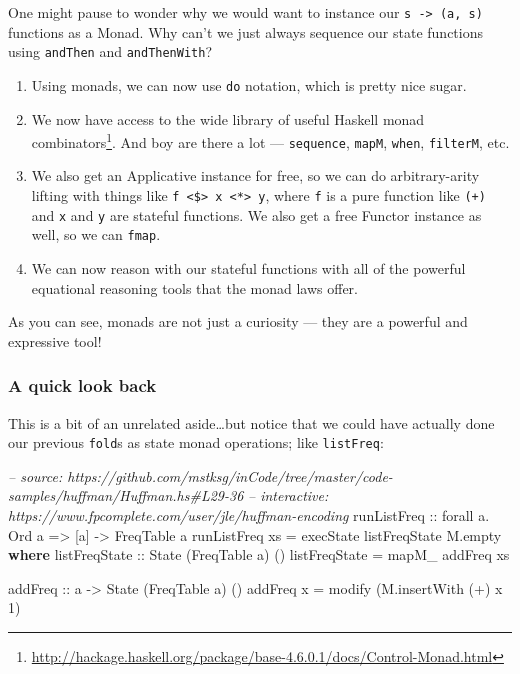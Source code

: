 \documentclass[]{article}
\newenvironment{Shaded}{\begin{snugshade}}{\end{snugshade}}
\newcommand{\CommentTok}[1]{\textcolor[rgb]{0.56,0.35,0.01}{\textit{#1}}}
\newcommand{\DataTypeTok}[1]{\textcolor[rgb]{0.13,0.29,0.53}{#1}}
\newcommand{\DecValTok}[1]{\textcolor[rgb]{0.00,0.00,0.81}{#1}}
\newcommand{\FunctionTok}[1]{\textcolor[rgb]{0.00,0.00,0.00}{#1}}
\newcommand{\KeywordTok}[1]{\textcolor[rgb]{0.13,0.29,0.53}{\textbf{#1}}}
\newcommand{\NormalTok}[1]{#1}
\newcommand{\OtherTok}[1]{\textcolor[rgb]{0.56,0.35,0.01}{#1}}
\renewcommand{\href}[2]{#2\footnote{\url{#1}}}
\begin{document}
One might pause to wonder why we would want to instance our
\texttt{s\ -\textgreater{}\ (a,\ s)} functions as a Monad. Why can't we just
always sequence our state functions using \texttt{andThen} and
\texttt{andThenWith}?

\begin{enumerate}
\def\labelenumi{\arabic{enumi}.}
\item
  Using monads, we can now use \texttt{do} notation, which is pretty nice sugar.
\item
  We now have access to the wide library of useful Haskell
  \href{http://hackage.haskell.org/package/base-4.6.0.1/docs/Control-Monad.html}{monad
  combinators}. And boy are there a lot --- \texttt{sequence}, \texttt{mapM},
  \texttt{when}, \texttt{filterM}, etc.
\item
  We also get an Applicative instance for free, so we can do arbitrary-arity
  lifting with things like
  \texttt{f\ \textless{}\$\textgreater{}\ x\ \textless{}*\textgreater{}\ y},
  where \texttt{f} is a pure function like \texttt{(+)} and \texttt{x} and
  \texttt{y} are stateful functions. We also get a free Functor instance as
  well, so we can \texttt{fmap}.
\item
  We can now reason with our stateful functions with all of the powerful
  equational reasoning tools that the monad laws offer.
\end{enumerate}

As you can see, monads are not just a curiosity --- they are a powerful and
expressive tool!

\hypertarget{a-quick-look-back}{%
\subsubsection{A quick look back}\label{a-quick-look-back}}

This is a bit of an unrelated aside\ldots{}but notice that we could have
actually done our previous \texttt{fold}s as state monad operations; like
\texttt{listFreq}:

\begin{Shaded}
\begin{Highlighting}[]
\CommentTok{-- source: https://github.com/mstksg/inCode/tree/master/code-samples/huffman/Huffman.hs#L29-36}
\CommentTok{-- interactive: https://www.fpcomplete.com/user/jle/huffman-encoding}
\OtherTok{runListFreq ::}\NormalTok{ forall a}\FunctionTok{.} \DataTypeTok{Ord}\NormalTok{ a }\OtherTok{=>}\NormalTok{ [a] }\OtherTok{->} \DataTypeTok{FreqTable}\NormalTok{ a}
\NormalTok{runListFreq xs }\FunctionTok{=}\NormalTok{ execState listFreqState M.empty}
  \KeywordTok{where}
\OtherTok{    listFreqState ::} \DataTypeTok{State}\NormalTok{ (}\DataTypeTok{FreqTable}\NormalTok{ a) ()}
\NormalTok{    listFreqState }\FunctionTok{=}\NormalTok{ mapM_ addFreq xs}

\OtherTok{    addFreq ::}\NormalTok{ a }\OtherTok{->} \DataTypeTok{State}\NormalTok{ (}\DataTypeTok{FreqTable}\NormalTok{ a) ()}
\NormalTok{    addFreq x }\FunctionTok{=}\NormalTok{ modify (M.insertWith (}\FunctionTok{+}\NormalTok{) x }\DecValTok{1}\NormalTok{)}
\end{Highlighting}
\end{Shaded}
\end{document}
